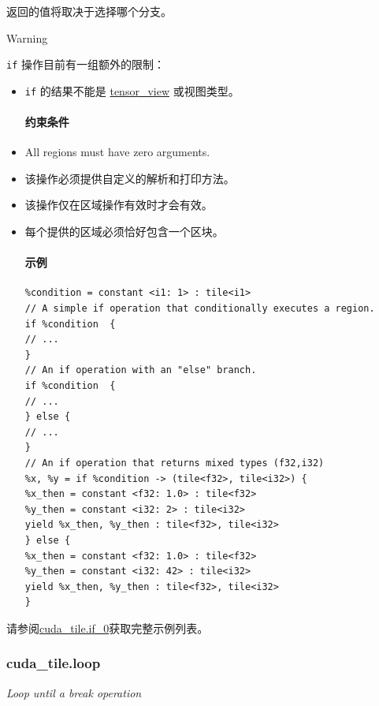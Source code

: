 \documentclass{article}
\begin{document}
返回的值将取决于选择哪个分支。


Warning


\texttt{if} 操作目前有一组额外的限制：


\begin{itemize}
\item \texttt{if} 的结果不能是 \href{https://docs.nvidia.com/cuda/tile-ir/latest/sections/types.html#type-tensor-view}{tensor\_view} 或视图类型。


\paragraph{约束条件}

\item All regions must have zero arguments.
\item 该操作必须提供自定义的解析和打印方法。
\item 该操作仅在区域操作有效时才会有效。
\item 每个提供的区域必须恰好包含一个区块。


\paragraph{示例}

\begin{lstlisting}
%condition = constant <i1: 1> : tile<i1>
// A simple if operation that conditionally executes a region.
if %condition  {
// ...
}
// An if operation with an "else" branch.
if %condition  {
// ...
} else {
// ...
}
// An if operation that returns mixed types (f32,i32)
%x, %y = if %condition -> (tile<f32>, tile<i32>) {
%x_then = constant <f32: 1.0> : tile<f32>
%y_then = constant <i32: 2> : tile<i32>
yield %x_then, %y_then : tile<f32>, tile<i32>
} else {
%x_then = constant <f32: 1.0> : tile<f32>
%y_then = constant <i32: 42> : tile<i32>
yield %x_then, %y_then : tile<f32>, tile<i32>
}
\end{lstlisting}

\end{itemize}
请参阅\href{https://docs.nvidia.com/cuda/tile-ir/latest/sections/appendix.html#example-cuda-tile-if-0}{cuda\_tile.if\_0}获取完整示例列表。



\subsubsection{cuda\_tile.loop}

\textit{Loop until a break operation}
\end{document}
